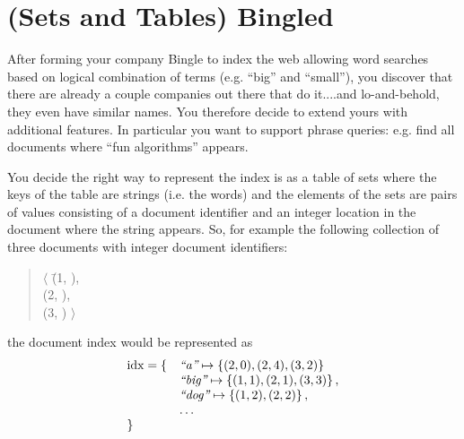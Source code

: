 \section{(Sets and Tables) Bingled}


%

After forming your company Bingle to index the web allowing word
searches based on logical combination of terms (e.g. ``big'' and
``small''), you discover that there are already a couple companies out
there that do it....and lo-and-behold, they even have similar names.
You therefore decide to extend yours with additional features.  In
particular you want to support phrase queries: e.g. find all
documents where ``fun algorithms'' appears.

You decide the right way to represent the index is as a table of sets
where the keys of the table are strings (i.e. the words) and the
elements of the sets are pairs of values consisting of a document
identifier and an integer location in the document where the string
appears.  So, for example the following collection of three documents
with integer document identifiers:

\begin{quote}
\begin{tabbing}
 $\langle$
  \=(1, ), \\
  \>(2, ),\\
  \>(3, ) $\rangle$
\end{tabbing}
\end{quote}

the document index would be represented as
\[
\begin{array}{ll}
\text{idx} = \{ & \mbox{\rm\em ``a''} \mapsto \left\{ (2,0),(2,4),(3,2) \right\}
\\
                &  \mbox{\rm\em ``big''} \mapsto \left\{ (1,1),(2,1),(3,3) \right\},
\\
                & \mbox{\rm\em ``dog''} \mapsto \left\{ (1,2),(2,2) \right\},
\\
                & \ldots
\\
             \} &
\end{array}
\]

